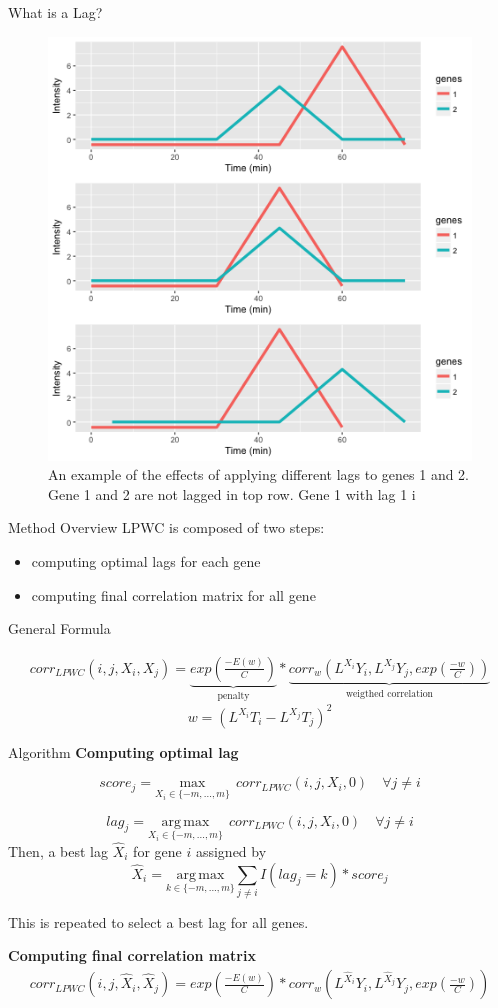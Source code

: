 \documentclass[10pt]{beamer}
\begin{document}
\begin{frame}{What is a Lag?}
\begin{figure}
     \includegraphics[width=0.60\linewidth]{Lags.png}
      \caption{An example of the effects of applying different lags to genes 1 and 2.  Gene 1 and 2 are not lagged in top row. Gene 1 with lag 1 i }
       \label{fig:lags}
    \end{figure}

\end{frame}


\begin{frame}{Method Overview}
LPWC is composed of two steps:
\begin{itemize}
\item computing optimal lags for each gene
\item computing final correlation matrix for all gene
\end{itemize}

General Formula


\begin{multline*}
corr_{LPWC}(i, j, X_i, X_j) = \underbrace{exp(\frac{- E(w)}{C})}_{\text{penalty}}  * 
\underbrace{corr_w(L^{X_i}Y_i, L^{X_j}Y_j, exp(\frac{- w}{C}))}_{\text{weigthed correlation}}
\end{multline*}
$$w = (L^{X_i}T_i - L^{X_j}T_j)^2$$
\end{frame}

\begin{frame}{Algorithm}
\textbf{Computing optimal lag}

$$score_{j} = \underset{X_i \in \{-m,..., m\}}{\mathrm{max}} \;\, corr_{LPWC}(i, j, X_i, 0) \quad \forall j \neq i$$

$$lag_{j} = \underset{X_i \in \{-m,..., m\}}{\mathrm{arg \,max}} \;\, corr_{LPWC}(i, j, X_i, 0) \quad \forall j \neq i$$
Then, a best lag $\hat{X}_i$ for gene $i$ assigned by 
\[
\hat{X}_i = \underset{k \in \{-m, ..., m\}}{\mathrm{arg \,max}} \sum_{j \neq i} I(lag_j = k) * score_j
\]

This is repeated to select a best lag for all genes.

\textbf{Computing final correlation matrix}
\begin{multline*}
 corr_{LPWC}(i, j, \hat{X}_i, \hat{X}_j) = 
exp(\frac{- E(w)}{C}) * corr_w(L^{\hat{X}_i}Y_i, L^{\hat{X}_j}Y_j, exp(\frac{- w}{C}))
\end{multline*}
\end{frame}
\end{document}
